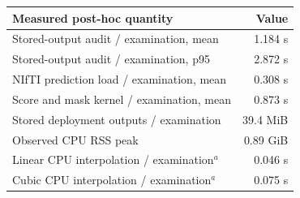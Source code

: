 \begin{tabular}{lr}
\toprule
Measured post-hoc quantity & Value \\
\midrule
Stored-output audit / examination, mean & 1.184 s \\ 
Stored-output audit / examination, p95 & 2.872 s \\ 
NIfTI prediction load / examination, mean & 0.308 s \\ 
Score and mask kernel / examination, mean & 0.873 s \\ 
Stored deployment outputs / examination & 39.4 MiB \\ 
Observed CPU RSS peak & 0.89 GiB \\ 
Linear CPU interpolation / examination$^{a}$ & 0.046 s \\ 
Cubic CPU interpolation / examination$^{a}$ & 0.075 s \\ 
\bottomrule
\end{tabular}
